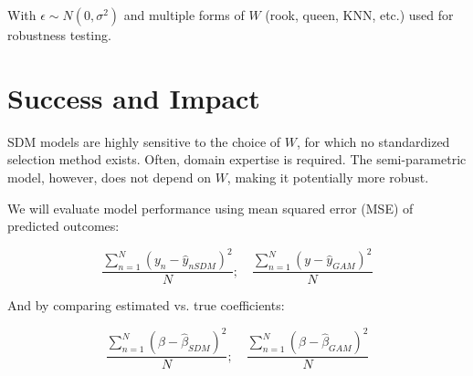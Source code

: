 \documentclass{article}
\begin{document}
With $\epsilon \sim N(0,\sigma^2)$ and multiple forms of $W$ (rook, queen, KNN, etc.) used for robustness testing.

\section{Success and Impact}

SDM models are highly sensitive to the choice of $W$, for which no standardized selection method exists. Often, domain expertise is required. The semi-parametric model, however, does not depend on $W$, making it potentially more robust.

We will evaluate model performance using mean squared error (MSE) of predicted outcomes:

\begin{equation}
	\frac{\sum_{n=1}^N(y_n-\hat{y}_{nSDM})^2}{N}; \quad \frac{\sum_{n=1}^N(y-\hat{y}_{GAM})^2}{N}
	\label{eq:pref}
\end{equation}

And by comparing estimated vs. true coefficients:

\begin{equation}
	\frac{\sum_{n=1}^N(\beta-\hat{\beta}_{SDM})^2}{N}; \quad \frac{\sum_{n=1}^N(\beta-\hat{\beta}_{GAM})^2}{N}
	\label{eq:pref2}
\end{equation}

\newpage



\end{document}
